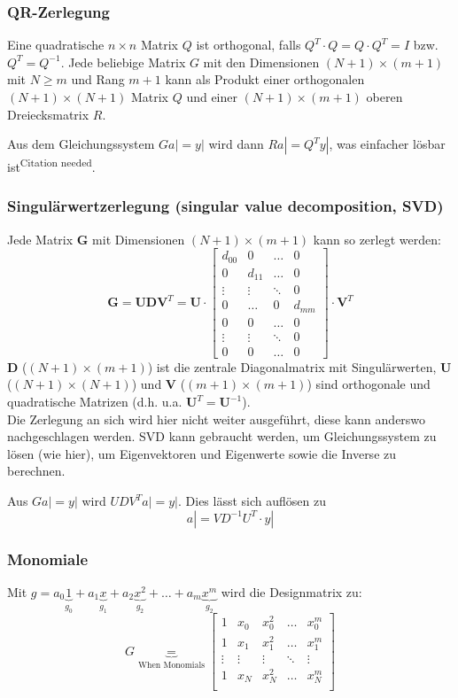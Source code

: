 \subsubsection{QR-Zerlegung}
Eine quadratische $n \times n$ Matrix $Q$ ist orthogonal, falls $Q^T \cdot Q = Q \cdot Q^T = I$ bzw. $Q^T = Q^{-1}$.
Jede beliebige Matrix $G$ mit den Dimensionen $(N+1) \times (m+1)$ mit $N \geq m$ und Rang $m+1$ kann als
Produkt einer orthogonalen $(N+1)\times(N+1)$ Matrix $Q$ und einer $(N+1)\times(m+1)$ oberen Dreiecksmatrix $R$.

Aus dem Gleichungssystem $Ga| = y|$ wird dann $Ra|=Q^Ty|$, was einfacher lösbar ist\textsuperscript{Citation needed}.

\subsubsection{Singulärwertzerlegung (singular value decomposition, SVD)}
Jede Matrix $\bm G$ mit Dimensionen $(N+1) \times (m+1)$ kann so zerlegt werden:
$$\bm G = \bm U \bm D \bm V^T = \bm U \cdot \begin{bmatrix}
  d_{00} & 0      & \ldots & 0\\
  0      & d_{11} & \ldots & 0\\
  \vdots & \vdots & \ddots & 0\\
  0      & \ldots & 0      & d_{mm}\\
  0      & 0      & \ldots & 0\\
  \vdots & \vdots & \ddots & 0\\
  0      & 0      & \ldots & 0
\end{bmatrix} \cdot \bm V^T$$
$\bm D$ ($(N+1) \times (m+1)$) ist die zentrale Diagonalmatrix mit Singulärwerten,
$\bm U$ ($(N+1) \times (N+1)$) und $\bm V$ ($(m+1) \times (m+1)$) sind orthogonale und quadratische
Matrizen (d.h. u.a. $\bm U^T=\bm U^{-1}$).\\

Die Zerlegung an sich wird hier nicht weiter ausgeführt, diese kann anderswo nachgeschlagen werden.
SVD kann gebraucht werden, um Gleichungssystem zu lösen (wie hier), um Eigenvektoren und Eigenwerte
sowie die Inverse zu berechnen.

Aus $Ga|=y|$ wird $UDV^T a|=y|$. Dies lässt sich auflösen zu
\[
    a| = V D^{-1}U^T \cdot y|
\]

\subsubsection{Monomiale} \label{sssec:ls_monomiale}
Mit
$g = a_0 \underbrace{1}_{g_0} + a_1 \underbrace{x}_{g_1} + a_2 \underbrace{x^2}_{g_2} +\ldots + a_m \underbrace{x^m}_{g_2}$
wird die Designmatrix zu:
\[G \underbrace{=}_{\text{When Monomials}}
\begin{bmatrix}
  1 & x_0 & x_0^2  & \ldots & x_0^m\\
  1 & x_1 & x_1^2  & \ldots & x_1^m\\
  \vdots  & \vdots & \vdots  & \ddots & \vdots\\
  1 & x_N & x_N^2  & \ldots & x_N^m\\
\end{bmatrix}\]


